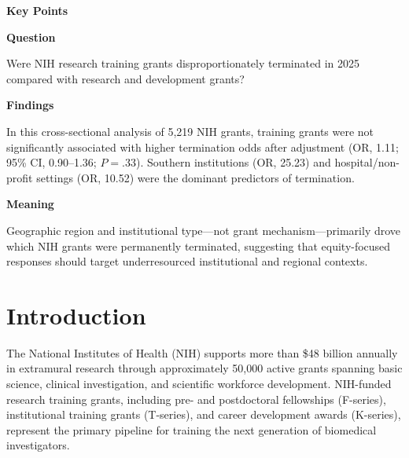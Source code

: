 \documentclass[10pt, letterpaper]{article}
\begin{document}
\begin{minipage}[t]{0.33\textwidth}
\begin{mdframed}[style=keypointsbox]
{\sffamily\bfseries\fontsize{10}{12}\selectfont\color{jamacrimson}
Key Points\par}
\vspace{4pt}

{\sffamily\bfseries\fontsize{8.5}{10.5}\selectfont Question\enspace}%
{\fontsize{8.5}{10.5}\selectfont
Were NIH research training grants disproportionately terminated in 2025 compared with research and development grants?\par}

\vspace{6pt}

{\sffamily\bfseries\fontsize{8.5}{10.5}\selectfont Findings\enspace}%
{\fontsize{8.5}{10.5}\selectfont
In this cross-sectional analysis of 5,219 NIH grants, training grants were not significantly associated with higher termination odds after adjustment (OR, 1.11; 95\% CI, 0.90--1.36; $P = .33$). Southern institutions (OR, 25.23) and hospital/non-profit settings (OR, 10.52) were the dominant predictors of termination.\par}

\vspace{6pt}

{\sffamily\bfseries\fontsize{8.5}{10.5}\selectfont Meaning\enspace}%
{\fontsize{8.5}{10.5}\selectfont
Geographic region and institutional type---not grant mechanism---primarily drove which NIH grants were permanently terminated, suggesting that equity-focused responses should target underresourced institutional and regional contexts.\par}
\end{mdframed}
\end{minipage}

\newpage

\section*{Introduction}

The National Institutes of Health (NIH) supports more than \$48 billion annually in extramural research through approximately 50,000 active grants spanning basic science, clinical investigation, and scientific workforce development.\cite{NIHBudget2025} NIH-funded research training grants, including pre- and postdoctoral fellowships (F-series), institutional training grants (T-series), and career development awards (K-series), represent the primary pipeline for training the next generation of biomedical investigators.\cite{Emamaullee2025,Rockey2010}
\end{document}
